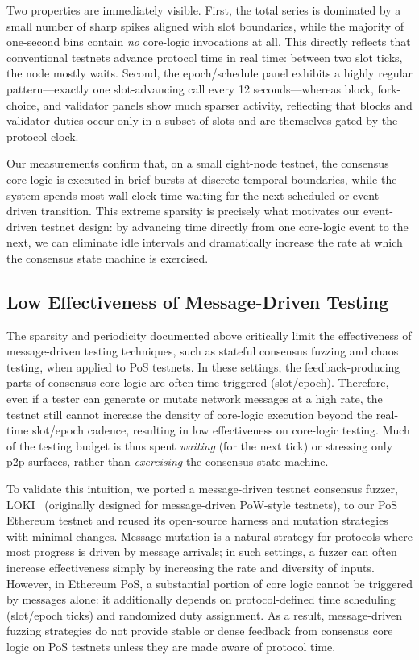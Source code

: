 Two properties are immediately visible. 
First, the total series is dominated by a small number of sharp spikes aligned with slot boundaries, while the majority of one-second bins contain \emph{no} core-logic invocations at all. This directly reflects that conventional testnets advance protocol time in real time: between two slot ticks, the node mostly waits.
Second, the epoch/schedule panel exhibits a highly regular pattern---exactly one slot-advancing call every 12 seconds---whereas block, fork-choice, and validator panels show much sparser activity, reflecting that blocks and validator duties occur only in a subset of slots and are themselves gated by the protocol clock.

Our measurements confirm that, on a small eight-node testnet, the consensus core logic is executed in brief bursts at discrete temporal boundaries, while the system spends most wall-clock time waiting for the next scheduled or event-driven transition. 
This extreme sparsity is precisely what motivates our event-driven testnet design: by advancing time directly from one core-logic event to the next, we can eliminate idle intervals and dramatically increase the rate at which the consensus state machine is exercised.


\subsection{Low Effectiveness of Message-Driven Testing}
\label{subsec:fuzzing_limitation}

The sparsity and periodicity documented above critically limit the effectiveness of message-driven testing techniques, such as stateful consensus fuzzing and chaos testing, when applied to PoS testnets.
In these settings, the feedback-producing parts of consensus core logic are often time-triggered (slot/epoch). Therefore, even if a tester can generate or mutate network messages at a high rate, the testnet still cannot increase the density of core-logic execution beyond the real-time slot/epoch cadence, resulting in low effectiveness on core-logic testing.
Much of the testing budget is thus spent \textit{waiting} (for the next tick) or stressing only p2p surfaces, rather than \textit{exercising} the consensus state machine.

To validate this intuition, we ported a message-driven testnet consensus fuzzer, \textsc{LOKI}~\cite{ma2023loki} (originally designed for message-driven PoW-style testnets), to our PoS Ethereum testnet and reused its open-source harness and mutation strategies with minimal changes.
Message mutation is a natural strategy for protocols where most progress is driven by message arrivals; in such settings, a fuzzer can often increase effectiveness simply by increasing the rate and diversity of inputs.
However, in Ethereum PoS, a substantial portion of core logic cannot be triggered by messages alone: it additionally depends on protocol-defined time scheduling (slot/epoch ticks) and randomized duty assignment.
As a result, message-driven fuzzing strategies do not provide stable or dense feedback from consensus core logic on PoS testnets unless they are made aware of protocol time.

